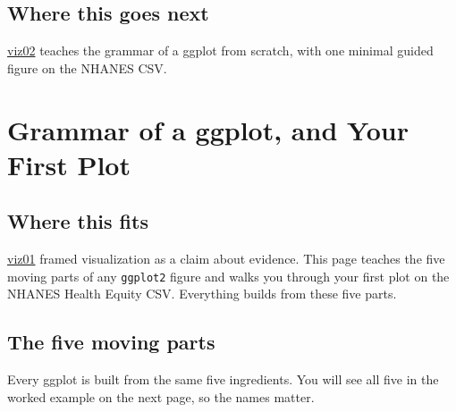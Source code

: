 \documentclass[
  letterpaper,
  DIV=11,
  numbers=noendperiod,
  oneside]{scrreprt}
\begin{document}
\section*{Where this goes next}\label{where-this-goes-next}


\href{viz02-grammar-and-first-plot.qmd}{viz02} teaches the grammar of a
ggplot from scratch, with one minimal guided figure on the NHANES CSV.

\chapter*{Grammar of a ggplot, and Your First
Plot}\label{grammar-of-a-ggplot-and-your-first-plot}


\section*{Where this fits}\label{where-this-fits}


\hyperref[why-visualize-and-what-for]{viz01} framed visualization as a
claim about evidence. This page teaches the five moving parts of any
\texttt{ggplot2} figure and walks you through your first plot on the
NHANES Health Equity CSV. Everything builds from these five parts.

\section*{The five moving parts}\label{the-five-moving-parts}


Every ggplot is built from the same five ingredients. You will see all
five in the worked example on the next page, so the names matter.
\end{document}
